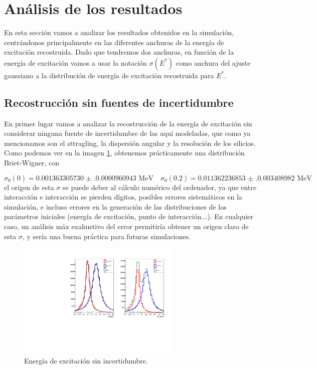 \section{Análisis de los resultados}

En esta sección vamos a analizar los resultados obtenidos en la simulación, centrándonos principalmente en las diferentes anchuras de la energía de excitación recostruida. Dado que tendremos dos anchuras, en función de la energía de excitación vamos a usar la notación $\sigma(E^*)$ como anchura del ajuste gaussiano a la distribución de energía de excitación recostruida para $E^*$.  

\subsection{Recostrucción sin fuentes de incertidumbre}

En primer lugar vamos a analizar la recostrucción de la energía de excitación sin considerar ninguna fuente de incertidumbre de las aquí modeladas, que como ya mencionamos son el sttragling, la dispersión angular y la resolución de los silicios. Como podemos ver en la imagen \cref{Fig:05-RecExcIdx3}, obtenemos prácticamente una distribución Briet-Wigner, con 

\begin{equation}
    \sigma_{0} (0) = \num{0.001363305730(0.0000960943)} \text{ MeV} \quad 
    \sigma_{0} (0.2) = \num{0.011362236853(0.0034089820)} \text{ MeV}
\end{equation} 
el origen de esta $\sigma$ se puede deber al cálculo numérico del ordenador, ya que entre interacción e interacción se pierden dígitos, posibles errores sistemáticos en la simulación, e incluso errores en la generación de las distribuciones de los parámetros iniciales (energía de excitación, punto de interacción...). En cualquier caso, un análisis máx exahustivo del error permitiría obtener un origen claro de esta $\sigma$, y sería una buena práctica para futuras simulaciones.

\vspace*{-0.25cm}
\begin{figure}[H]
    \centering
    \includegraphics[width=0.7\textwidth]{Imagenes/Rec_incIdx3_single.pdf}
    \caption{Energía de excitación sin incertidumbre.}
    \label{Fig:05-RecExcIdx3}
\end{figure}

